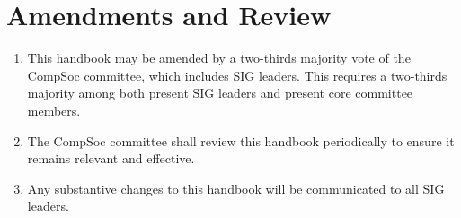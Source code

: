 \section{Amendments and Review}
\begin{enumerate}
\item This handbook may be amended by a two-thirds majority vote of the CompSoc committee, which includes SIG leaders. This requires a two-thirds majority among both present SIG leaders and present core committee members.
\item The CompSoc committee shall review this handbook periodically to ensure it remains relevant and effective.
\item Any substantive changes to this handbook will be communicated to all SIG leaders.
\end{enumerate}